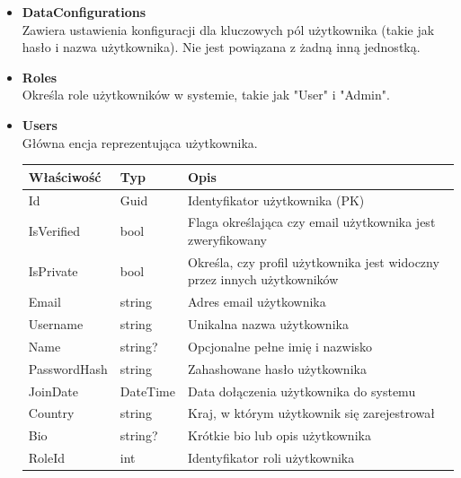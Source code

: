 \documentclass[12pt,a4paper]{article}
\begin{document}
\begin{itemize}
    \item \textbf{DataConfigurations}\\
    Zawiera ustawienia konfiguracji dla kluczowych pól użytkownika (takie jak hasło i nazwa użytkownika). Nie jest powiązana z żadną inną jednostką.

    \item \textbf{Roles}\\
    Określa role użytkowników w systemie, takie jak "User" i "Admin".

    \item \textbf{Users}\\
    Główna encja reprezentująca użytkownika.
    \renewcommand{\arraystretch}{1.5}
    \begin{longtable}{|m{4cm}|m{2cm}|m{8cm}|}
        \hline
        \rowcolor{lightgray}
        \textbf{Właściwość} & \textbf{Typ} & \textbf{Opis} \\ \hline
        \endhead
        \hline
        Id & Guid & Identyfikator użytkownika (PK) \\ \hline
        IsVerified & bool & Flaga określająca czy email użytkownika jest zweryfikowany \\ \hline
        IsPrivate & bool & Określa, czy profil użytkownika jest widoczny przez innych użytkowników \\ \hline
        Email & string & Adres email użytkownika \\ \hline
        Username & string & Unikalna nazwa użytkownika \\ \hline
        Name & string? & Opcjonalne pełne imię i nazwisko \\ \hline
        PasswordHash & string & Zahashowane hasło użytkownika \\ \hline
        JoinDate & DateTime & Data dołączenia użytkownika do systemu \\ \hline
        Country & string & Kraj, w którym użytkownik się zarejestrował \\ \hline
        Bio & string? & Krótkie bio lub opis użytkownika \\ \hline
        RoleId & int & Identyfikator roli użytkownika\\ \hline
    \end{longtable}


\end{itemize}
\end{document}
